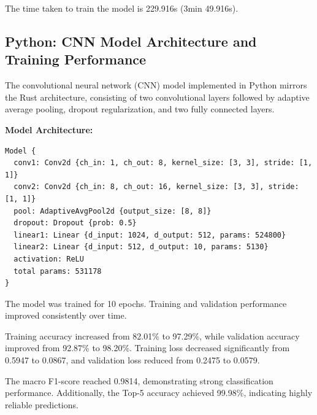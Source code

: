 \documentclass[10pt,a4paper,twocolumn]{article}
\begin{document}
The time taken to train the model is 229.916s (3min 49.916s).



\subsection{Python: CNN Model Architecture and Training Performance}

The convolutional neural network (CNN) model implemented in Python mirrors the Rust architecture, consisting of two convolutional layers followed by adaptive average pooling, dropout regularization, and two fully connected layers.

\textbf{Model Architecture:}

\begin{verbatim}
Model {
  conv1: Conv2d {ch_in: 1, ch_out: 8, kernel_size: [3, 3], stride: [1, 1]}
  conv2: Conv2d {ch_in: 8, ch_out: 16, kernel_size: [3, 3], stride: [1, 1]}
  pool: AdaptiveAvgPool2d {output_size: [8, 8]}
  dropout: Dropout {prob: 0.5}
  linear1: Linear {d_input: 1024, d_output: 512, params: 524800}
  linear2: Linear {d_input: 512, d_output: 10, params: 5130}
  activation: ReLU
  total params: 531178
}
\end{verbatim}

The model was trained for 10 epochs. Training and validation performance improved consistently over time.

Training accuracy increased from 82.01\% to 97.29\%, while validation accuracy improved from 92.87\% to 98.20\%. 
Training loss decreased significantly from 0.5947 to 0.0867, and validation loss reduced from 0.2475 to 0.0579.

The macro F1-score reached 0.9814, demonstrating strong classification performance. Additionally, the Top-5 accuracy achieved 99.98\%, indicating highly reliable predictions.
\end{document}
